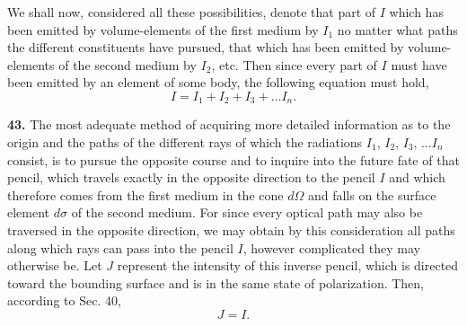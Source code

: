 \documentclass[12pt,oneside]{book}
\begin{document}
We shall now, considered all these possibilities, denote that part of $I$ which has been emitted by volume-elements of the first medium by $I_1$ no matter what paths the different constituents have pursued, that which has been emitted by volume-elements of the second medium by $I_2$, etc. Then since every part of $I$ must have been emitted by an element of some body, the following equation must hold, 
\begin{equation}
    \label{eq44}
    I=I_1+I_2+I_3+\dots I_n.
\end{equation} \par 

\textbf{43.} The most adequate method of acquiring more detailed information as to the origin and the paths of the different rays of which the radiations $I_1,\, I_2,\, I_3,\,\dots I_n$ consist, is to pursue the opposite course and to inquire into the future fate of that pencil, which travels exactly in the opposite direction to the pencil $I$ and which therefore comes from the first medium in the cone $d\Omega$ and falls on the surface element $d\sigma$ of the second medium. For since every optical path may also be traversed in the opposite direction, we may obtain by this consideration all paths along which rays can pass into the pencil $I$, however complicated they may otherwise be. Let $J$ represent the intensity of this inverse pencil, which is directed toward the bounding surface and is in the same state of polarization. Then, according to Sec. 40, 
\begin{equation}
    \label{eq45}
    J=I.
\end{equation} \par 
\end{document}
